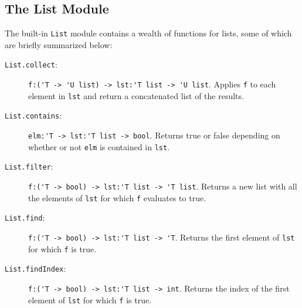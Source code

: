 \subsection{The List Module}
The built-in \lstinline{List} module contains a wealth of functions for lists, some of which are
briefly summarized below:
\begin{description}
\item[\texttt{List.collect}:] \lstinline{f:('T -> 'U list) -> lst:'T list -> 'U list}. Applies \lstinline{f} to each element in \lstinline{lst} and return a concatenated list of the results.
\item[\texttt{List.contains}:] \lstinline{elm:'T -> lst:'T list -> bool}. Returns true or false depending on whether or not \lstinline{elm} is contained in \lstinline{lst}.
\item[\texttt{List.filter}:] \lstinline{f:('T -> bool) -> lst:'T list -> 'T list}. Returns a new list with all the elements of \lstinline{lst} for which \lstinline{f} evaluates to true.
\item[\texttt{List.find}:] \lstinline{f:('T -> bool) -> lst:'T list -> 'T}. Returns the first element of \lstinline{lst} for which \lstinline{f} is true.
\item[\texttt{List.findIndex}:] \lstinline{f:('T -> bool) -> lst:'T list -> int}. Returns the index of the first element of \lstinline{lst} for which \lstinline{f} is true.

\end{description}
